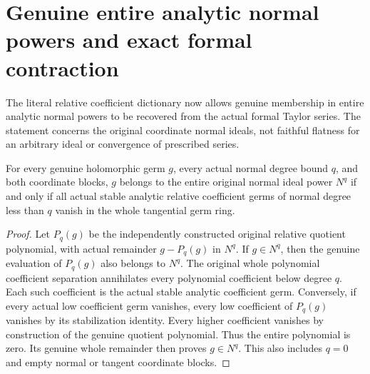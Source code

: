 \section{Genuine entire analytic normal powers and exact formal contraction}

The literal relative coefficient dictionary now allows genuine membership in
entire analytic normal powers to be recovered from the actual formal Taylor
series. The statement concerns the original coordinate normal ideals, not
faithful flatness for an arbitrary ideal or convergence of prescribed series.

\begin{theorem}
\label{hir:actual-entire-analytic-normal-power-relative-coefficient-kernel}
\leanok
For every genuine holomorphic germ $g$, every actual normal degree bound $q$,
and both coordinate blocks, $g$ belongs to the entire original normal ideal
power $N^q$ if and only if all actual stable analytic relative coefficient
germs of normal degree less than $q$ vanish in the whole tangential germ ring.
\end{theorem}
\begin{proof}
Let $P_q(g)$ be the independently constructed original relative quotient
polynomial, with actual remainder $g-P_q(g)$ in $N^q$. If $g\in N^q$, then
the genuine evaluation of $P_q(g)$ also belongs to $N^q$. The original whole
polynomial coefficient separation annihilates every polynomial coefficient
below degree $q$. Each such coefficient is the actual stable analytic
coefficient germ. Conversely, if every actual low coefficient germ vanishes,
every low coefficient of $P_q(g)$ vanishes by its stabilization identity.
Every higher coefficient vanishes by construction of the genuine quotient
polynomial. Thus the entire polynomial is zero. Its genuine whole remainder
then proves $g\in N^q$. This also includes $q=0$ and empty normal or tangent
coordinate blocks.
\end{proof}

